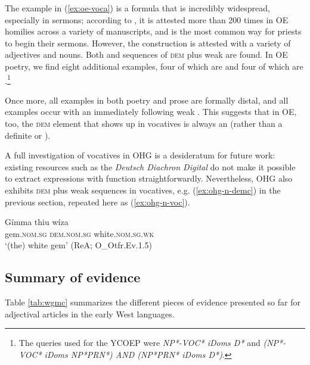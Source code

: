 \documentclass[output=paper,colorlinks,citecolor=brown]{langscibook}
\begin{document}
The example in (\ref{ex:oe-voca}) is a formula that is incredibly widespread, especially in sermons; according to \citet{Porck2020}, it is attested more than 200 times in OE homilies across a variety of manuscripts, and is the most common way for priests to begin their sermons. However, the construction is attested with a variety of adjectives and nouns. Both  and  sequences of \textsc{dem} plus weak  are found. In OE poetry, we find eight additional examples, four of which are  and four of which are .\footnote{The queries used for the YCOEP \citep{YCOEP} were \textit{NP*-VOC* iDoms D*} and \textit{(NP*-VOC* iDoms NP*PRN*) AND (NP*PRN* iDoms D*)}.}

Once more, all examples in both poetry and prose are formally distal, and all examples occur with an immediately following weak . This suggests that in OE, too, the \textsc{dem} element that shows up in vocatives is always an  (rather than a definite  or ).

A full investigation of vocatives in OHG is a desideratum for future work: existing resources such as the \textit{Deutsch Diachron Digital}  do not make it possible to extract expressions with  function straightforwardly. Nevertheless, OHG also exhibits \textsc{dem} plus weak  sequences in vocatives, e.g. (\ref{ex:ohg-n-demc}) in the previous section, repeated here as (\ref{ex:ohg-n-voc}).

\begin{exe}     
  \ex \label{ex:ohg-n-voc} \gll Gímma thiu wíza\\
  gem.\textsc{nom.sg} \textsc{dem.nom.sg} white.\textsc{nom.sg.wk}\\
  \glt `(the) white gem' (ReA; O\_Otfr.Ev.1.5)
\end{exe}

\subsection{Summary of evidence}

Table \ref{tab:wgmc} summarizes the different pieces of evidence presented so far for adjectival articles in the early West  languages.
\end{document}
